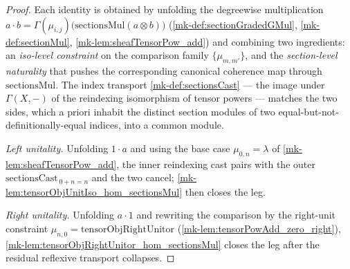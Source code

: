 \begin{proof}  
  Each identity is obtained by unfolding the degreewise multiplication
  \(a \cdot b = \Gamma(\mu_{i,j})\bigl(\mathrm{sectionsMul}(a \otimes b)\bigr)\)
  (\ref{mk-def:sectionGradedGMul}, \ref{mk-def:sectionMul},
  \ref{mk-lem:sheafTensorPow_add}) and combining two ingredients: an
  \emph{iso-level constraint} on the comparison family \(\{\mu_{m,m'}\}\), and the
  \emph{section-level naturality} that pushes the corresponding canonical coherence
  map through \(\mathrm{sectionsMul}\). The index transport \ref{mk-def:sectionsCast}
  --- the image under \(\Gamma(X,-)\) of the reindexing isomorphism of tensor
  powers --- matches the two sides, which a priori inhabit the distinct section
  modules of two equal-but-not-definitionally-equal indices, into a common module.

  \emph{Left unitality.} Unfolding \(1 \cdot a\) and using the base case
  \(\mu_{0,n} = \lambda\) of \ref{mk-lem:sheafTensorPow_add}, the inner reindexing
  cast pairs with the outer \(\mathrm{sectionsCast}_{\,0+n=n}\) and the two cancel;
  \ref{mk-lem:tensorObjUnitIso_hom_sectionsMul} then closes the leg.

  \emph{Right unitality.} Unfolding \(a \cdot 1\) and rewriting the comparison by
  the right-unit constraint \(\mu_{n,0} = \mathrm{tensorObjRightUnitor}\)
  (\ref{mk-lem:tensorPowAdd_zero_right}),
  \ref{mk-lem:tensorObjRightUnitor_hom_sectionsMul} closes the leg after the residual
  reflexive transport collapses.


\end{proof}
